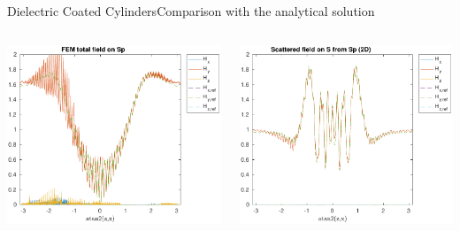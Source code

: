 \begin{frame}[allowframebreaks]{Dielectric Coated Cylinders}{Comparison with the analytical solution }
\begin{columns}
      \includegraphics[width=\linewidth]{results/TEc15/H_Sp.pdf}

      \includegraphics[width=\linewidth]{results/TEc15/H_S.pdf}
      
    \end{columns}
    




  \end{frame}

  

